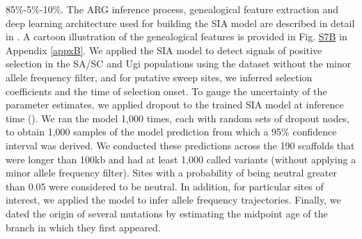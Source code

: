 85\%-5\%-10\%. The \ac{ARG} inference process, genealogical feature extraction and deep learning architecture used for building the \ac{SIA} model are described in detail in \cite{hejase_deep-learning_2022}. A cartoon illustration of the genealogical features is provided in Fig. \href{https://journals.plos.org/PLOSGENETICS/article?id=10.1371/journal.pgen.1010474#sec017}{S7B} in Appendix \ref{appxB}. We applied the \ac{SIA} model to detect signals of positive selection in the \ac{SA/SC} and Ugi populations using the dataset without the minor allele frequency filter, and for putative sweep sites, we inferred selection coefficients and the time of selection onset. To gauge the uncertainty of the parameter estimates, we applied dropout to the trained \ac{SIA} model at inference time (\cite{gal_dropout_2016}). We ran the model 1,000 times, each with random sets of dropout nodes, to obtain 1,000 samples of the model prediction from which a 95\% confidence interval was derived. We conducted these predictions across the 190 scaffolds that were longer than 100kb and had at least 1,000 called variants (without applying a minor allele frequency filter). Sites with a probability of being neutral greater than 0.05 were considered to be neutral. In addition, for particular sites of interest, we applied the model to infer allele frequency trajectories. Finally, we dated the origin of several mutations by estimating the midpoint age of the branch in which they first appeared.

